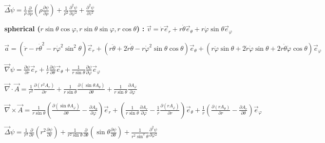 \begin{squishlist}
\item $\vec{\Delta}\psi = \frac{1}{\rho}\frac{\partial}{\partial \rho}\left(\rho\frac{\partial\psi}{\partial \rho}\right) + \frac{1}{\rho^2}\frac{\partial^2\psi}{\partial\varphi^2} + \frac{\partial^2\psi}{\partial z^2}$

\item[] \textbf{spherical ($r\sin\theta\cos\varphi, r\sin\theta\sin\varphi, r \cos \theta$) : \:}
$\vec{v} = \dot{r}\vec{e}_r + r\dot{\theta}\vec{e}_\theta + r\dot{\varphi}\sin\theta\vec{e}_\varphi$

\item $\vec{a} = (\ddot{r} - r\dot{\theta}^2 - r\dot{\varphi}^2\sin^2\theta)\vec{e}_r + (r\ddot{\theta} + 2\dot{r}\dot{\theta} - r\dot{\varphi}^2\sin\theta\cos\theta)\vec{e}_\theta + (r\ddot{\varphi}\sin\theta + 2\dot{r}\dot{\varphi}\sin\theta + 2r\dot{\theta}\dot{\varphi}\cos\theta)\vec{e}_\varphi$

\item $\vec{\nabla}\psi=\frac{\partial \psi}{\partial r}\vec{e}_r+\frac{1}{r}\frac{\partial \psi}{\partial\theta}\vec{e}_{\theta}+\frac{1}{r\sin\theta}\frac{\partial \psi}{\partial \varphi}\vec{e}_\varphi$

\item $\vec{\nabla} \cdot \vec{A}=\frac{1}{r^2}\frac{\partial (r^2A_r)}{\partial r}+\frac{1}{r\sin\theta}\frac{\partial(\sin\theta A_{\theta})}{\partial\theta}+\frac{1}{r\sin\theta}\frac{\partial A_{\varphi}}{\partial\varphi}$

\item $\vec{\nabla} \times \vec{A} = \frac{1}{r \sin \theta} \left( \frac{\partial (\sin \theta A_{\varphi})}{\partial \theta} - \frac{\partial A_{\theta}}{\partial \varphi} \right) \vec{e}_r + \left( \frac{1}{r \sin \theta} \frac{\partial A_r}{\partial \varphi} - \frac{1}{r} \frac{\partial (r A_{\varphi})}{\partial r} \right) \vec{e}_{\theta} + \frac{1}{r} \left( \frac{\partial (r A_{\theta})}{\partial r} - \frac{\partial A_r}{\partial \theta} \right) \vec{e}_{\varphi}$

\item $\vec{\Delta}\psi = \frac{1}{r^2}\frac{\partial}{\partial r}\left(r^2\frac{\partial\psi}{\partial r}\right) + \frac{1}{r^2\sin\theta}\frac{\partial}{\partial\theta}\left(\sin\theta\frac{\partial\psi}{\partial\theta}\right) + \frac{1}{r^2\sin^2\theta}\frac{\partial^2\psi}{\partial\varphi^2}$

\end{squishlist}
